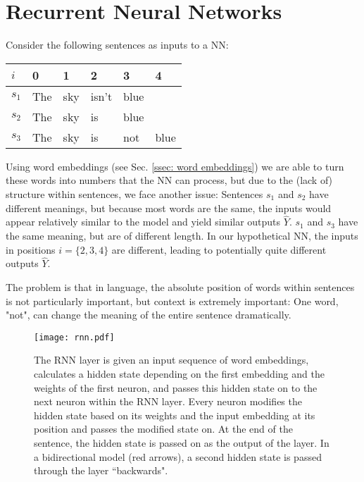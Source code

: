 \section{Recurrent Neural Networks \label{ssec: RNNs}}
    Consider the following sentences as inputs to a NN: 
    
    \begin{table}[h]
    \begin{tabular}{|l|l|l|l|l|l|}
        \hline
        $i$   & 0   & 1   & 2     & 3    & 4    \\ \hline
        $s_1$ & The & sky & isn't & blue &      \\ \hline
        $s_2$ & The & sky & is    & blue &      \\ \hline
        $s_3$ & The & sky & is    & not  & blue \\ \hline
    \end{tabular}
    \centering
    \end{table}
    
    Using word embeddings (see Sec. \ref{ssec: word embeddings}) we are able to turn these words into numbers that the NN can process, but due to the (lack of) structure within sentences, we face another issue:
    Sentences $s_1$ and $s_2$ have different meanings, but because most words are the same, the inputs would appear relatively similar to the model and yield similar outputs $\hat{Y}$. $s_1$ and $s_3$ have the same meaning, but are of different length. In our hypothetical NN, the inputs in positions $i = \{2, 3, 4\}$ are different, leading to potentially quite different outputs $\hat{Y}$.
    
    The problem is that in language, the absolute position of words within sentences is not particularly important, but context is extremely important: One word, "not", can change the meaning of the entire sentence dramatically.
    
    \begin{figure}[h]
        \centering
        \texttt{[image: rnn.pdf]}
        \caption{The RNN layer is given an input sequence of word embeddings, calculates a hidden state depending on the first embedding and the weights of the first neuron, and passes this hidden state on to the next neuron within the RNN layer. Every neuron modifies the hidden state based on its weights and the input embedding at its position and passes the modified state on. At the end of the sentence, the hidden state is passed on as the output of the layer. In a bidirectional model (red arrows), a second hidden state is passed through the layer ``backwards".}
        \label{fig:rnn}
    \end{figure}
    
